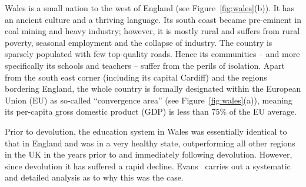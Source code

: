 \documentclass{sig-alternate}
\begin{document}

Wales is a small nation to the west of England
(see Figure~\ref{fig:wales}(b)).
It has an ancient culture and a thriving language.
Its south coast became pre-eminent in coal mining and heavy industry;
however, it is mostly rural and suffers from rural poverty,
seasonal employment and the collapse of industry.
The country is sparsely populated with few top-quality roads.
Hence its communities
-- and more specifically its schools and teachers --
suffer from the perils of isolation.
Apart from the south east corner (including its capital Cardiff)
and the regions bordering England, the whole country is
formally designated within the European Union (EU) as so-called
``convergence area''
(see Figure~\ref{fig:wales}(a)),
meaning its per-capita gross domestic product (GDP)
is less than 75\% of the EU average.

Prior to devolution, the education system in Wales was essentially
identical to that in England and was in a very healthy state,
outperforming all other regions in the UK
in the years prior to and immediately following devolution.
However, since devolution it has suffered a rapid decline.
Evans~\cite{Evans:2015} carries out a systematic and detailed
analysis as to why this was the case.
\end{document}
